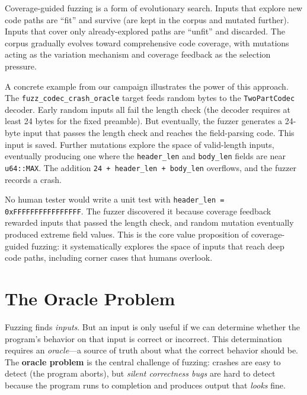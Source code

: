 \begin{insightbox}
Coverage-guided fuzzing is a form of evolutionary search. Inputs that explore new code paths are ``fit'' and survive (are kept in the corpus and mutated further). Inputs that cover only already-explored paths are ``unfit'' and discarded. The corpus gradually evolves toward comprehensive code coverage, with mutations acting as the variation mechanism and coverage feedback as the selection pressure.
\end{insightbox}

A concrete example from our campaign illustrates the power of this approach. The \texttt{fuzz\_codec\_\allowbreak crash\_oracle} target feeds random bytes to the \texttt{TwoPartCodec} decoder. Early random inputs all fail the length check (the decoder requires at least 24 bytes for the fixed preamble). But eventually, the fuzzer generates a 24-byte input that passes the length check and reaches the field-parsing code. This input is saved. Further mutations explore the space of valid-length inputs, eventually producing one where the \texttt{header\_len} and \texttt{body\_len} fields are near \texttt{u64::MAX}. The addition \texttt{24 + header\_len + body\_len} overflows, and the fuzzer records a crash.

No human tester would write a unit test with \texttt{header\_len = 0xFFFFFFFFFFFFFFFF}. The fuzzer discovered it because coverage feedback rewarded inputs that passed the length check, and random mutation eventually produced extreme field values. This is the core value proposition of coverage-guided fuzzing: it systematically explores the space of inputs that reach deep code paths, including corner cases that humans overlook.

\section{The Oracle Problem}
\label{sec:fuzzing:oracle}

%
Fuzzing finds \emph{inputs}. But an input is only useful if we can determine whether the program's behavior on that input is correct or incorrect. This determination requires an \emph{oracle}---a source of truth about what the correct behavior should be. The \textbf{oracle problem} is the central challenge of fuzzing: crashes are easy to detect (the program aborts), but \emph{silent correctness bugs} are hard to detect because the program runs to completion and produces output that \emph{looks} fine.

